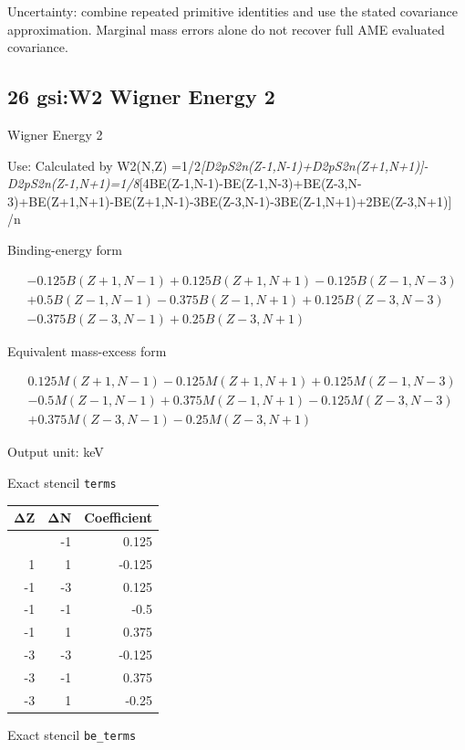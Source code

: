 \documentclass[
  11pt,
  letterpaper,
]{article}
\begin{document}
Uncertainty: combine repeated primitive identities and use the stated
covariance approximation. Marginal mass errors alone do not recover full
AME evaluated covariance.

\subsection{26 gsi:W2 Wigner Energy 2}\label{gsiw2-wigner-energy-2}

Wigner Energy 2

Use: Calculated by W2(N,Z)
=1/2\emph{{[}D2pS2n(Z-1,N-1)+D2pS2n(Z+1,N+1){]}-D2pS2n(Z-1,N+1)=1/8}{[}4BE(Z-1,N-1)-BE(Z-1,N-3)+BE(Z-3,N-3)+BE(Z+1,N+1)-BE(Z+1,N-1)-3BE(Z-3,N-1)-3BE(Z-1,N+1)+2BE(Z-3,N+1){]}
/n

Binding-energy form

\[
\begin{aligned}
& -0.125B(Z+1,N-1)+0.125B(Z+1,N+1)-0.125B(Z-1,N-3) \\
& +0.5B(Z-1,N-1)-0.375B(Z-1,N+1)+0.125B(Z-3,N-3) \\
& -0.375B(Z-3,N-1)+0.25B(Z-3,N+1)
\end{aligned}
\]

Equivalent mass-excess form

\[
\begin{aligned}
& 0.125M(Z+1,N-1)-0.125M(Z+1,N+1)+0.125M(Z-1,N-3) \\
& -0.5M(Z-1,N-1)+0.375M(Z-1,N+1)-0.125M(Z-3,N-3) \\
& +0.375M(Z-3,N-1)-0.25M(Z-3,N+1)
\end{aligned}
\]

Output unit: keV

Exact stencil \texttt{terms}

\begin{longtable}[]{@{}rrr@{}}
\toprule\noalign{}
ΔZ & ΔN & Coefficient \\
\midrule\noalign{}
\endhead
\bottomrule\noalign{}
\endlastfoot
1 & -1 & 0.125 \\
1 & 1 & -0.125 \\
-1 & -3 & 0.125 \\
-1 & -1 & -0.5 \\
-1 & 1 & 0.375 \\
-3 & -3 & -0.125 \\
-3 & -1 & 0.375 \\
-3 & 1 & -0.25 \\
\end{longtable}

Exact stencil \texttt{be\_terms}
\end{document}
